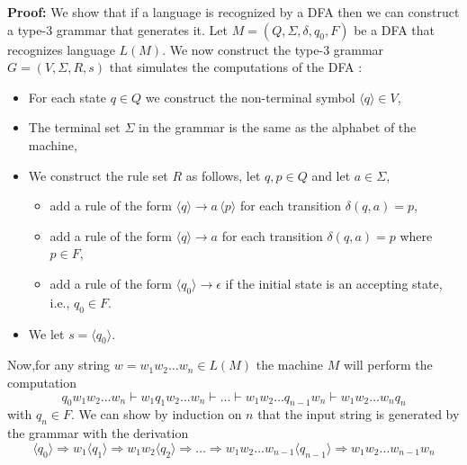 \documentclass[a4paper,blends,pdf,colorBG,slideColor]{prosper}
\begin{document}
{\bf Proof:} We show that if a language is recognized by a DFA then we can construct a type-3
grammar that generates it.
Let $M=(Q,\Sigma,\delta,q_0,F)$ be a DFA that recognizes language $L(M)$.
We now construct the type-3 grammar
$G = (V,\Sigma,R, s)$ that simulates the computations of the DFA :
\begin{itemize}
\item For each state $q\in Q$ we construct the non-terminal symbol $\langle q \rangle\in V$, 
\item The terminal set $\Sigma$ in the grammar  is the same as the alphabet of the machine,
\item We construct the rule set $R$ as follows, let $q,p\in Q$ and let $a\in\Sigma$,
\begin{itemize}
 \item add a  rule of the form $\langle q\rangle \rightarrow  a\, \langle p\rangle$ for each transition  $\delta(q, a) = p$,
\item add a rule of the form $\langle q\rangle \rightarrow  a$ for each transition $\delta(q, a) = p$ where $p\in F$,
\item add a rule of the form $\langle q_0\rangle \rightarrow \epsilon$   if the initial state is an accepting state, i.e., $q_0\in F$.
\end{itemize}
\item We let $s = \langle q_0 \rangle$.
\end{itemize}
\es


Now,for any string $w=w_1 w_2\ldots w_n\in L(M)$ the machine $M$ will perform the computation
\[
q_0 w_1 w_2 \ldots w_n \vdash  w_1 q_1 w_2 \ldots w_n \vdash  \ldots  \vdash 
 w_1 w_2 \ldots q_{n-1}w_n \vdash  w_1 w_2 \ldots w_n q_n
\]
with $q_n \in F$. We can show by induction on $n$ that the input string is generated by the grammar with the derivation
\[
\langle q_0\rangle \Rightarrow w_1\langle q_1\rangle \Rightarrow w_1 w_2\langle q_2 \rangle \Rightarrow \ldots 
\Rightarrow w_1 w_2 \ldots w_{n-1} \langle q_{n-1}\rangle \Rightarrow w_1 w_2 \ldots w_{n-1} w_n  
\]

\es
\end{document}
